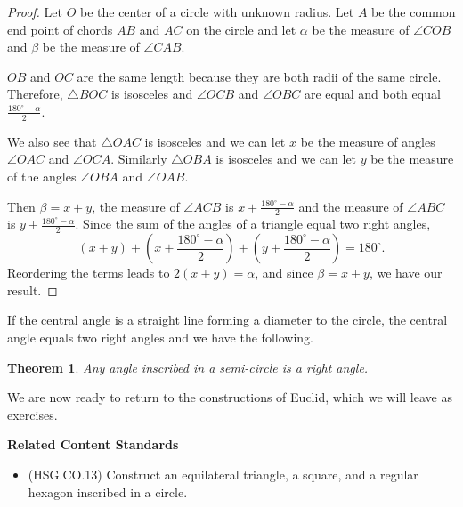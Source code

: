 \documentclass[
]{book}
\providecommand{\tightlist}{%
  \setlength{\itemsep}{0pt}\setlength{\parskip}{0pt}}
\newenvironment{standards}{}{}
\newtheorem{theorem}{Theorem}[chapter]
\theoremstyle{definition}
\theoremstyle{definition}
\theoremstyle{definition}
\theoremstyle{definition}
\theoremstyle{remark}
\begin{document}
\begin{proof}
Let \(O\) be the center of a circle with unknown radius. Let \(A\) be the common end point of chords \(AB\) and \(AC\) on the circle and let \(\alpha\) be the measure of \(\angle COB\) and \(\beta\) be the measure of \(\angle CAB\).

\(OB\) and \(OC\) are the same length because they are both radii of the same circle. Therefore, \(\triangle BOC\) is isosceles and \(\angle OCB\) and \(\angle OBC\) are equal and both equal \(\frac{180^\circ - \alpha}{2}\).

We also see that \(\triangle OAC\) is isosceles and we can let \(x\) be the measure of angles \(\angle OAC\) and \(\angle OCA\). Similarly \(\triangle OBA\) is isosceles and we can let \(y\) be the measure of the angles \(\angle OBA\) and \(\angle OAB\).

Then \(\beta = x+y\), the measure of \(\angle ACB\) is \(x+\frac{180^\circ - \alpha}{2}\) and the measure of \(\angle ABC\) is \(y+\frac{180^\circ - \alpha}{2}\). Since the sum of the angles of a triangle equal two right angles,
\[(x+y) + \left(x+\frac{180^\circ - \alpha}{2}\right) + \left(y+\frac{180^\circ - \alpha}{2}\right) = 180^\circ.\]
Reordering the terms leads to \(2(x+y) = \alpha\), and since \(\beta=x+y\), we have our result.
\end{proof}

If the central angle is a straight line forming a diameter to the circle, the central angle equals two right angles and we have the following.

\begin{theorem}
Any angle inscribed in a semi-circle is a right angle.
\end{theorem}

We are now ready to return to the constructions of Euclid, which we will leave as exercises.

\begin{standards}

\begin{center}
\textbf{Related Content Standards}

\end{center}

\begin{itemize}
\tightlist
\item
  (HSG.CO.13) Construct an equilateral triangle, a square, and a regular hexagon inscribed in a circle.
\end{itemize}

\end{standards}
\end{document}
